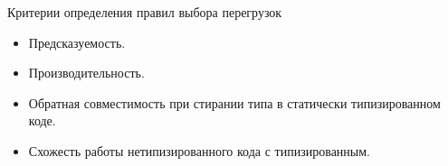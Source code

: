\documentclass[t]{beamer}  %
\begin{document}


\begin{frame}[fragile]
	\frametitle{\insertsection} 
  	\framesubtitle{\insertsubsection}
    \begin{block}{Критерии определения правил выбора перегрузок}
    \begin{itemize}
		  \item Предсказуемость.
          \item Производительность.
          \item Обратная совместимость при стирании типа в статически типизированном коде.
          \item Схожесть работы нетипизированного кода с типизированным.
    \end{itemize}
    \end{block}
\end{frame}
\end{document}
